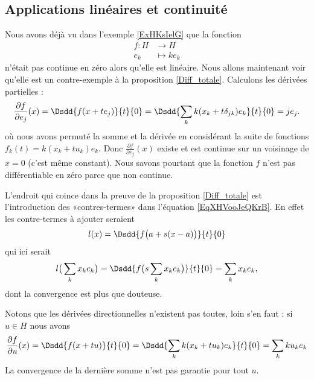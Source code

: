 \subsection{Applications linéaires et continuité}

Nous avons déjà vu dans l'exemple \ref{ExHKsIelG} que la fonction 
\begin{equation}    \label{EqCJVooJOuXdN}
    \begin{aligned}
        f\colon H&\to H \\
        e_k&\mapsto ke_k 
    \end{aligned}
\end{equation}
n'était pas continue en zéro alors qu'elle est linéaire. Nous allons maintenant voir qu'elle est un contre-exemple à la proposition \ref{Diff_totale}. Calculons les dérivées partielles :
\begin{equation}
    \frac{ \partial f }{ \partial e_j }(x)=\Dsdd{ f(x+te_j) }{t}{0}=\Dsdd{ \sum_k k(x_k+t\delta_{jk})e_k }{t}{0}=je_j.
\end{equation}
où nous avons permuté la somme et la dérivée en considérant la suite de fonctions \( f_k(t)=k(x_k+tu_k)e_k\). Donc \( \frac{ \partial f }{ \partial e_j }(x)\) existe et est continue sur un voisinage de \( x=0\) (c'est même constant). Nous savons pourtant que la fonction \( f\) n'est pas différentiable en zéro parce que non continue.

L'endroit qui coince dans la preuve de la proposition \ref{Diff_totale} est l'introduction des «contres-termes» dans l'équation \eqref{EqXHVooJeQKrB}. En effet les contre-termes à ajouter seraient
\begin{equation}
    l(x)=\Dsdd{ f\big( a+s(x-a) \big) }{t}{0}
\end{equation}
qui ici serait
\begin{equation}
    l\big( \sum_kx_ke_k \big)=\Dsdd{ f\big( s\sum_kx_ke_k \big) }{t}{0}=\sum_kx_ke_k,
\end{equation}
dont la convergence est plus que douteuse.

Notons que les dérivées directionnelles n'existent pas toutes, loin s'en faut : si \( u\in H\) nous avons
\begin{equation}        \label{EQooWNLOooJNRUMQ}
    \frac{ \partial f }{ \partial u }(x)=\Dsdd{ f(x+tu) }{t}{0}=\Dsdd{ \sum_k k(x_k+tu_k)e_k }{t}{0}=\sum_k ku_ke_k
\end{equation}
La convergence de la dernière somme n'est pas garantie pour tout \( u\).

